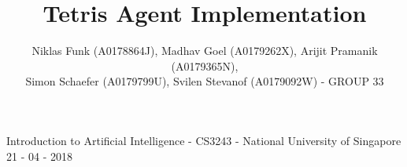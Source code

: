 \documentclass[10pt]{article}
\title{\LARGE \bf Tetris Agent Implementation}
\author{Niklas Funk (A0178864J), Madhav Goel (A0179262X), Arijit Pramanik (A0179365N), \\ Simon Schaefer (A0179799U), Svilen Stevanof (A0179092W) - GROUP 33}
\date{\vspace{-5ex}}
\begin{document}
\begin{center}
Introduction to Artificial Intelligence - CS3243 - National University of Singapore \\
21 - 04 - 2018 
\end{center}
\vspace*{-4em}

{\let\newpage\relax\maketitle}
\maketitle
\thispagestyle{empty}
\pagestyle{empty}

\parindent 0pt

\begin{multicols}{2}





\end{multicols}

\newpage
\begin{multicols}{2}


\end{multicols}
\end{document}
